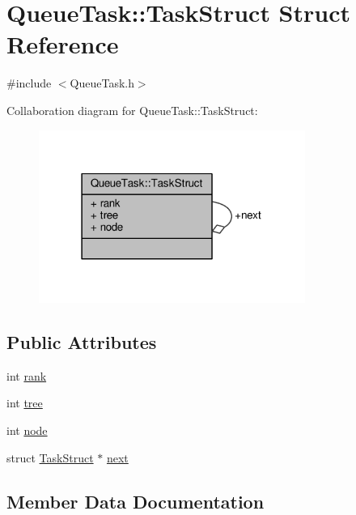 \hypertarget{structQueueTask_1_1TaskStruct}{}\section{Queue\+Task\+:\+:Task\+Struct Struct Reference}
\label{structQueueTask_1_1TaskStruct}


{\ttfamily \#include $<$Queue\+Task.\+h$>$}



Collaboration diagram for Queue\+Task\+:\+:Task\+Struct\+:
\nopagebreak
\begin{figure}[H]
\begin{center}
\leavevmode
\includegraphics[width=247pt]{structQueueTask_1_1TaskStruct__coll__graph}
\end{center}
\end{figure}
\subsection*{Public Attributes}
\begin{DoxyCompactItemize}
\item 
int \hyperlink{structQueueTask_1_1TaskStruct_af9877fb064cb899ac88ffef431d98f47}{rank}
\item 
int \hyperlink{structQueueTask_1_1TaskStruct_a6b1c9ba8e5b30acfa78e61c95c7cb897}{tree}
\item 
int \hyperlink{structQueueTask_1_1TaskStruct_a22eb8e22f500809266c4983897b9af7f}{node}
\item 
struct \hyperlink{structQueueTask_1_1TaskStruct}{Task\+Struct} $\ast$ \hyperlink{structQueueTask_1_1TaskStruct_aff77873a32e938c956c84deb01f98e65}{next}
\end{DoxyCompactItemize}


\subsection{Member Data Documentation}
